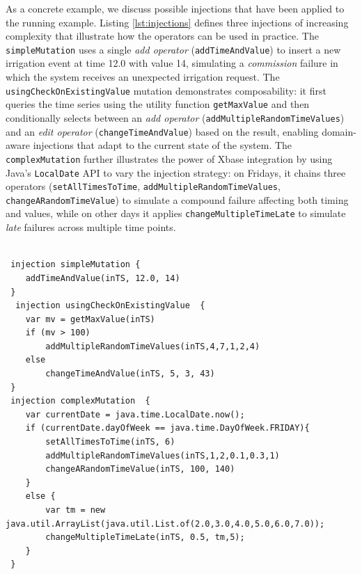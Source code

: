 As a concrete example, we discuss possible injections that have been applied to the running example. Listing \ref{lst:injections} defines three injections of increasing complexity that illustrate how the operators can be used in practice. The \texttt{simpleMutation} uses a single \textit{add operator} (\texttt{addTimeAndValue}) to insert a new irrigation event at time 12.0 with value 14, simulating a \textit{commission} failure in which the system receives an unexpected irrigation request. The \texttt{usingCheckOnExistingValue} mutation demonstrates composability: it first queries the time series using the utility function \texttt{getMaxValue} and then conditionally selects between an \textit{add operator} (\texttt{addMultipleRandomTimeValues}) and an \textit{edit operator} (\texttt{changeTimeAndValue}) based on the result, enabling domain-aware injections that adapt to the current state of the system. The \texttt{complexMutation} further illustrates the power of Xbase integration by using Java's \texttt{LocalDate} API to vary the injection strategy: on Fridays, it chains three operators (\texttt{setAllTimesToTime}, \texttt{addMultipleRandomTimeValues}, \texttt{changeARandomTimeValue}) to simulate a compound failure affecting both timing and values, while on other days it applies \texttt{changeMultipleTimeLate} to simulate \textit{late} failures across multiple time points.



\begin{lstlisting}[style=JavaStyle,caption=Specification of the injections.,label=lst:injections]

 injection simpleMutation {
 	addTimeAndValue(inTS, 12.0, 14)
 }
  injection usingCheckOnExistingValue  {
 	var mv = getMaxValue(inTS)
 	if (mv > 100)
 		addMultipleRandomTimeValues(inTS,4,7,1,2,4)
 	else
 		changeTimeAndValue(inTS, 5, 3, 43)
 }
 injection complexMutation  {
 	var currentDate = java.time.LocalDate.now();
 	if (currentDate.dayOfWeek == java.time.DayOfWeek.FRIDAY){
		setAllTimesToTime(inTS, 6)
		addMultipleRandomTimeValues(inTS,1,2,0.1,0.3,1)
 		changeARandomTimeValue(inTS, 100, 140)
 	}
 	else {
 		var tm = new java.util.ArrayList(java.util.List.of(2.0,3.0,4.0,5.0,6.0,7.0));
 		changeMultipleTimeLate(inTS, 0.5, tm,5);
 	}
 }
\end{lstlisting}

